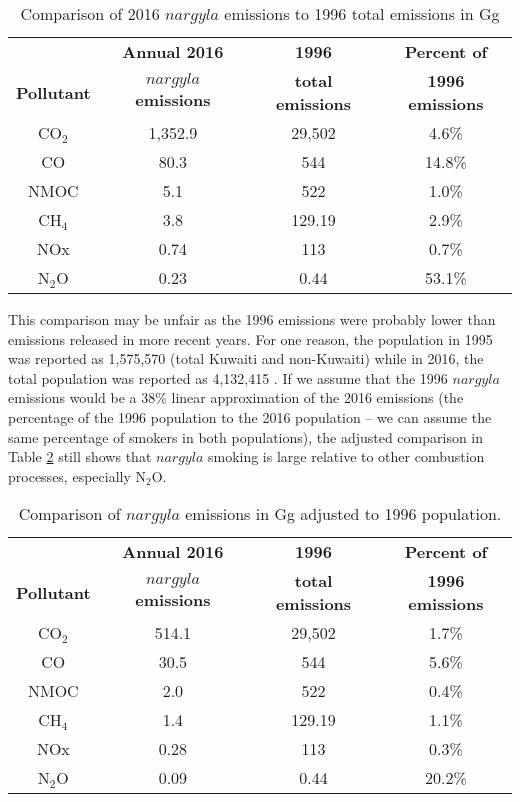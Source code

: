 %
\begin{table}[H]
\centering
\caption{Comparison of 2016 $nargyla$ emissions to 1996 total emissions in Gg}
\label{tb8:comparison}
\begin{tabular}{@{}cccc@{}}
\toprule
 & \textbf{Annual 2016} & \textbf{1996} & \textbf{Percent of} \\
\textbf{Pollutant} & \textbf{$nargyla$ emissions} & \textbf{total emissions} & \textbf{1996 emissions} \\ \midrule
CO$_{2}$ & 1,352.9 & 29,502 & 4.6\% \\
CO & 80.3 & 544 & 14.8\% \\
NMOC & 5.1 & 522 & 1.0\% \\
CH$_{4}$ & 3.8 & 129.19 & 2.9\% \\
NOx & 0.74 & 113 & 0.7\% \\
N$_{2}$O & 0.23 & 0.44 & 53.1\% \\ \bottomrule
\end{tabular}
\end{table}

This comparison may be unfair as the 1996 emissions were probably lower than emissions released in more recent years.  For one reason, the population in 1995 was reported as 1,575,570 (total Kuwaiti and non-Kuwaiti) while in 2016, the total population was reported as 4,132,415 \citep{CSB2017}.  If we assume that the 1996 $nargyla$ emissions would be a 38\% linear approximation of the 2016 emissions (the percentage of the 1996 population to the 2016 population – we can assume the same percentage of smokers in both populations), the adjusted comparison in Table \ref{tb9:adjusted} still shows that $nargyla$ smoking is large relative to other combustion processes, especially N$_{2}$O.
%
\begin{table}[H]
\centering
\caption{Comparison of $nargyla$ emissions in Gg adjusted to 1996 population.}
\label{tb9:adjusted}
\begin{tabular}{@{}cccc@{}}
\toprule
 & \textbf{Annual 2016} & \textbf{1996} & \textbf{Percent of} \\
\textbf{Pollutant} & \textbf{$nargyla$ emissions} & \textbf{total emissions} & \textbf{1996 emissions} \\ \midrule
CO$_{2}$ & 514.1 & 29,502 & 1.7\% \\
CO & 30.5 & 544 & 5.6\% \\
NMOC & 2.0 & 522 & 0.4\% \\
CH$_{4}$ & 1.4 & 129.19 & 1.1\% \\
NOx & 0.28 & 113 & 0.3\% \\
N$_{2}$O & 0.09 & 0.44 & 20.2\% \\ \bottomrule
\end{tabular}
\end{table}
\clearpage
